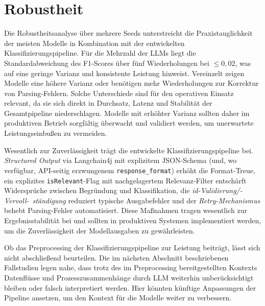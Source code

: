 \section{Robustheit}\label{sec:robustheit2}

Die Robustheitsanalyse über mehrere Seeds unterstreicht die Praxistauglichkeit der meisten Modelle in Kombination mit der entwickelten Klassifizierungspipeline. Für die Mehrzahl der \acp{LLM} liegt die Standardabweichung des F1-Scores über fünf Wiederholungen bei $\leq 0{,}02$, was auf eine geringe Varianz und konsistente Leistung hinweist. Vereinzelt zeigen Modelle eine höhere Varianz oder benötigen mehr Wiederholungen zur Korrektur von Parsing-Fehlern. Solche Unterschiede sind für den operativen Einsatz relevant, da sie sich direkt in Durchsatz, Latenz und Stabilität der Gesamtpipeline niederschlagen. Modelle mit erhöhter Varianz sollten daher im produktiven Betrieb sorgfältig überwacht und validiert werden, um unerwartete Leistungseinbußen zu vermeiden.

Wesentlich zur Zuverlässigkeit trägt die entwickelte Klassifizierungspipeline bei. \emph{Structured Output} via Langchain4j mit explizitem JSON-Schema (und, wo verfügbar, API-seitig erzwungenem \texttt{response\_format}) erhöht die Format-Treue, ein explizites \texttt{isRelevant}-Flag mit nachgelagertem Relevanz-Filter entschärft Widersprüche zwischen Begründung und Klassifikation, die \emph{id-Validierung/-Vervoll-\linebreak~ständigung} reduziert typische Ausgabefehler und der \emph{Retry-Mechanismus} behebt Parsing-Fehler automatisiert. Diese Maßnahmen tragen wesentlich zur Ergebnisstabilität bei und sollten in produktiven Systemen implementiert werden, um die Zuverlässigkeit der Modellausgaben zu gewährleisten.

Ob das Preprocessing der Klassifizierungspipeline zur Leistung beiträgt, lässt sich nicht abschließend beurteilen. Die im nächsten Abschnitt beschriebenen Fallstudien legen nahe, dass trotz des im Preprocessing bereitgestellten Kontexts Datenflüsse und Prozesszusammenhänge durch \ac{LLM} weiterhin unberücksichtigt bleiben oder falsch interpretiert werden. Hier könnten künftige Anpassungen der Pipeline ansetzen, um den Kontext für die Modelle weiter zu verbessern.